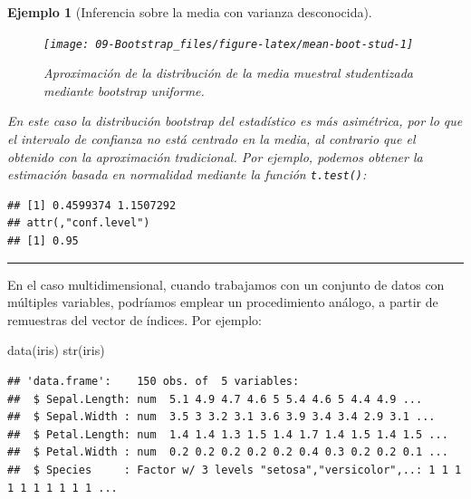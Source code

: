 \documentclass[
]{book}
\newenvironment{Shaded}{\begin{snugshade}}{\end{snugshade}}
\newcommand{\FunctionTok}[1]{\textcolor[rgb]{0.00,0.00,0.00}{#1}}
\newcommand{\NormalTok}[1]{#1}
\newcommand{\SpecialCharTok}[1]{\textcolor[rgb]{0.00,0.00,0.00}{#1}}
\theoremstyle{break}
\newtheorem{example}{Ejemplo}[chapter]
\theoremstyle{nonumberplain}
\begin{document}
\begin{example}[Inferencia sobre la media con varianza desconocida]
\begin{figure}[!htb]

{\centering \texttt{[image: 09-Bootstrap\_files/figure-latex/mean-boot-stud-1]} 

}

\caption{Aproximación de la distribución de la media muestral studentizada mediante bootstrap uniforme.}\label{fig:mean-boot-stud}
\end{figure}

En este caso la distribución bootstrap del estadístico es más asimétrica, por lo que el intervalo de confianza no está centrado en la media,
al contrario que el obtenido con la aproximación tradicional.
Por ejemplo, podemos obtener la estimación basada en normalidad mediante la función \texttt{t.test()}:

\begin{Shaded}
\end{Shaded}

\begin{verbatim}
## [1] 0.4599374 1.1507292
## attr(,"conf.level")
## [1] 0.95
\end{verbatim}

\end{example}

\begin{center}\rule{0.5\linewidth}{0.5pt}\end{center}

En el caso multidimensional, cuando trabajamos con un conjunto de datos con múltiples variables, podríamos emplear un procedimiento análogo, a partir de remuestras del vector de índices.
Por ejemplo:

\begin{Shaded}
\begin{Highlighting}[]
\FunctionTok{data}\NormalTok{(iris)}
\FunctionTok{str}\NormalTok{(iris)}
\end{Highlighting}
\end{Shaded}

\begin{verbatim}
## 'data.frame':    150 obs. of  5 variables:
##  $ Sepal.Length: num  5.1 4.9 4.7 4.6 5 5.4 4.6 5 4.4 4.9 ...
##  $ Sepal.Width : num  3.5 3 3.2 3.1 3.6 3.9 3.4 3.4 2.9 3.1 ...
##  $ Petal.Length: num  1.4 1.4 1.3 1.5 1.4 1.7 1.4 1.5 1.4 1.5 ...
##  $ Petal.Width : num  0.2 0.2 0.2 0.2 0.2 0.4 0.3 0.2 0.2 0.1 ...
##  $ Species     : Factor w/ 3 levels "setosa","versicolor",..: 1 1 1 1 1 1 1 1 1 1 ...
\end{verbatim}
\end{document}
